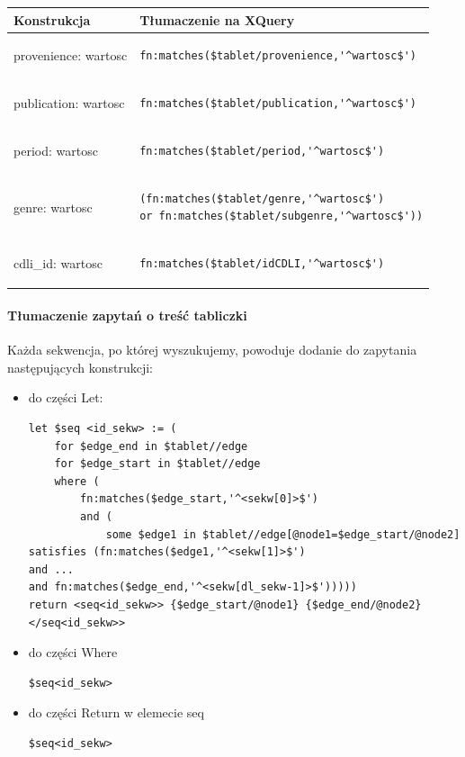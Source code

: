 \begin{longtable}{|p{2.5in}|p{3.5in}|}
\hline
{\bf Konstrukcja} & {\bf Tłumaczenie na XQuery}\\
\hline
\endhead
provenience: wartosc & \begin{verbatim}fn:matches($tablet/provenience,'^wartosc$')\end{verbatim}
\\
\hline
publication: wartosc & \begin{verbatim}fn:matches($tablet/publication,'^wartosc$')\end{verbatim}
\\
\hline
period: wartosc & \begin{verbatim}fn:matches($tablet/period,'^wartosc$')\end{verbatim}
\\
\hline
genre: wartosc & \begin{verbatim}(fn:matches($tablet/genre,'^wartosc$')
or fn:matches($tablet/subgenre,'^wartosc$'))\end{verbatim}
\\
\hline
cdli\_id: wartosc & \begin{verbatim}fn:matches($tablet/idCDLI,'^wartosc$')\end{verbatim}
\\
\hline
\end{longtable}


\paragraph{Tłumaczenie zapytań o treść tabliczki}
Każda sekwencja, po której wyszukujemy, powoduje dodanie do zapytania następujących konstrukcji:
\begin{itemize}
\item{do części Let:}
\begin{verbatim}
let $seq <id_sekw> := (
	for $edge_end in $tablet//edge
	for $edge_start in $tablet//edge
	where (
		fn:matches($edge_start,'^<sekw[0]>$')
		and (
			some $edge1 in $tablet//edge[@node1=$edge_start/@node2]
satisfies (fn:matches($edge1,'^<sekw[1]>$')
and ... 
and fn:matches($edge_end,'^<sekw[dl_sekw-1]>$')))))
return <seq<id_sekw>> {$edge_start/@node1} {$edge_end/@node2} </seq<id_sekw>>
\end{verbatim}
\item{do części Where}
\begin{verbatim}
$seq<id_sekw>
\end{verbatim}
\item{do części Return w elemecie seq}
\begin{verbatim}
$seq<id_sekw>
\end{verbatim}
\end{itemize}





